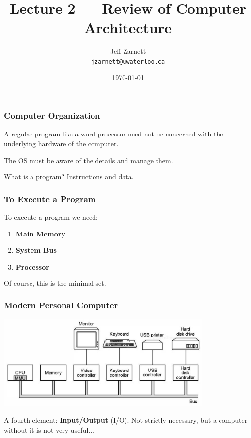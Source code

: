 

\title{Lecture 2 --- Review of Computer Architecture}

\author{Jeff Zarnett \\ \small \texttt{jzarnett@uwaterloo.ca}}
\date{\today}




\begin{frame}
  \titlepage

 \end{frame}

\begin{frame}
\frametitle{Computer Organization}

A regular program like a word processor need not be concerned with the underlying hardware of the computer.

The OS must be aware of the details and manage them.

What is a program? Instructions and data.


\end{frame}

\begin{frame}
\frametitle{To Execute a Program}

To execute a program we need:

\begin{enumerate}
	\item \textbf{Main Memory}
	\item \textbf{System Bus}
	\item \textbf{Processor}
\end{enumerate}

Of course, this is the minimal set.

\end{frame}

\begin{frame}
\frametitle{Modern Personal Computer}

\begin{center}
\includegraphics[width=0.8\textwidth]{images/modernpc.png}
\end{center}

A fourth element: \textbf{Input/Output} (I/O). Not strictly necessary, but a computer without it is not very useful...
\end{frame}

